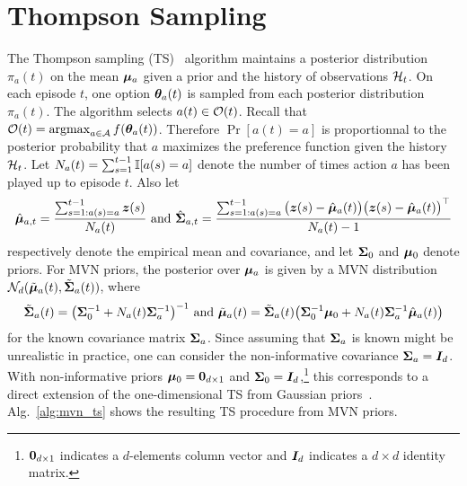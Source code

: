 
\section{Thompson Sampling}
\label{sec:ts}

The Thompson sampling (TS)~\cite{Thompson1933} algorithm maintains a posterior distribution $\pi_a(t)$ on the mean $\boldsymbol{\mu}_a$ given a prior and the history of observations $\mathcal{H}_t$. On each episode $t$, one option $\boldsymbol{\theta}_a(t)$ is sampled from each posterior distribution $\pi_a(t)$. The algorithm selects $a(t) \in \mathcal{O}(t)$. Recall that $\mathcal{O}(t) = \operatorname*{argmax}_{a \in \mathcal{A}} f(\boldsymbol{\theta}_a(t))$. Therefore $\Pr[a(t) = a]$ is proportionnal to the posterior probability that $a$ maximizes the preference function given the history $\mathcal{H}_t$. Let $N_a(t) = \sum_{s = 1}^{t-1} \mathbb{I}[a(s) = a]$ denote the number of times action $a$ has been played up to episode $t$. Also let
\begin{align*}
    \hat {\boldsymbol{\mu}}_{a, t} = \frac{\sum_{s = 1: a(s) = a}^{t-1} \boldsymbol{z}(s)}{N_a(t)}
    ~\text{and}~
    \hat {\boldsymbol{\Sigma}}_{a, t} = \frac{\sum_{s = 1: a(s) = a}^{t - 1} \big( \boldsymbol{z}(s) - \hat {\boldsymbol{\mu}}_a(t) \big) \big( \boldsymbol{z}(s) - \hat {\boldsymbol{\mu}}_a(t) \big)^\top}{N_a(t) - 1}
\end{align*}
respectively denote the empirical mean and covariance, and let $\boldsymbol{\Sigma}_0$ and $\boldsymbol{\mu}_0$ denote priors. For MVN priors, the posterior over $\boldsymbol{\mu}_a$ is given by a MVN distribution $\mathcal{N}_d (\tilde {\boldsymbol{\mu}}_a(t), \tilde {\boldsymbol{\Sigma}}_a(t))$, where
\begin{align*}
    \tilde {\boldsymbol{\Sigma}}_a(t) = \big( \boldsymbol{\Sigma}_0^{-1} + N_a(t) \boldsymbol{\Sigma}_a^{-1} \big)^{-1} ~ \text{and} ~
    \tilde {\boldsymbol{\mu}}_a(t) = \tilde {\boldsymbol{\Sigma}}_a(t) \big( \boldsymbol{\Sigma}_0^{-1} \boldsymbol{\mu}_0 + N_a(t) \boldsymbol{\Sigma}_a^{-1} \hat {\boldsymbol{\mu}}_a(t) \big)
\end{align*}
for the known covariance matrix $\boldsymbol{\Sigma}_a$. Since assuming that $\boldsymbol{\Sigma}_a$ is known might be unrealistic in practice, one can consider the non-informative covariance $\boldsymbol{\Sigma}_a = \boldsymbol{I}_d$. With non-informative priors $\boldsymbol{\mu}_0 = \boldsymbol{0}_{d \times 1}$ and $\boldsymbol{\Sigma}_0 = \boldsymbol{I}_d$,\footnote{$\boldsymbol{0}_{d \times 1}$ indicates a $d$-elements column vector and $\boldsymbol{I}_d$ indicates a $d \times d$ identity matrix.} this corresponds to a direct extension of the one-dimensional TS from Gaussian priors~\cite{Agrawal2013}. Alg.~\ref{alg:mvn_ts} shows the resulting TS procedure from MVN priors.

